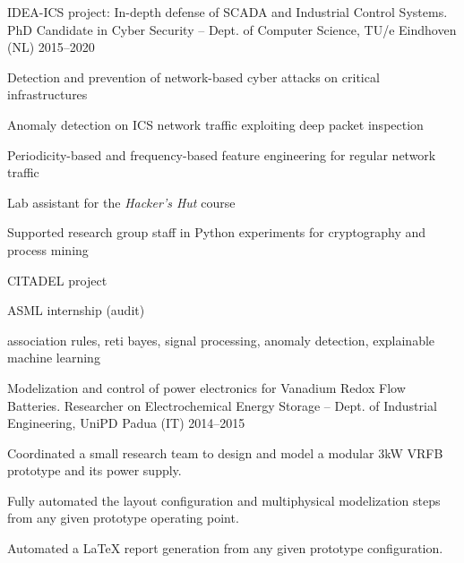 
\begin{cventries}
    \cventry%
        {{IDEA-ICS} project: In-depth defense of SCADA and Industrial Control Systems.} %
        {PhD Candidate in Cyber Security -- Dept. of Computer Science, TU/e} %
        {Eindhoven (NL)} %
        {2015--2020} %
        {\begin{cvitems}
            \item Detection and prevention of network-based cyber attacks on critical infrastructures
            \item Anomaly detection on ICS network traffic exploiting deep packet inspection
            \item Periodicity-based and frequency-based feature engineering for regular network traffic
            \item Lab assistant for the \emph{Hacker's Hut} course
            \item Supported research group staff in Python experiments for cryptography and process mining
            \item CITADEL project
            \item ASML internship (audit)
            \item association rules, reti bayes, signal processing, anomaly detection, explainable machine learning
        \end{cvitems}}


    \cventry%
        {Modelization and control of power electronics for Vanadium Redox Flow Batteries.}
        {Researcher on Electrochemical Energy Storage -- Dept. of Industrial Engineering, UniPD}
        {Padua (IT)}
        {2014--2015}
        {\begin{cvitems}
            \item Coordinated a small research team to design and model a modular 3kW VRFB prototype and its power supply.
            \item Fully automated the layout configuration and multiphysical modelization steps from any given prototype operating point.
            \item Automated a LaTeX report generation from any given prototype configuration.
        \end{cvitems}}


\end{cventries}
